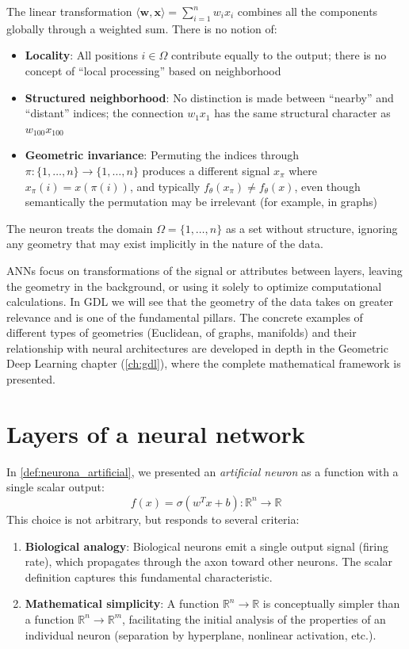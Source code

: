 The linear transformation $\langle \mathbf{w}, \mathbf{x} \rangle = \sum_{i=1}^n w_i x_i$ combines all the components globally through a weighted sum. There is no notion of:

\begin{itemize}
	\item \textbf{Locality}: All positions $i \in \Omega$ contribute equally to the output; there is no concept of ``local processing'' based on neighborhood

	\item \textbf{Structured neighborhood}: No distinction is made between ``nearby'' and ``distant'' indices; the connection $w_1 x_1$ has the same structural character as $w_{100} x_{100}$

	\item \textbf{Geometric invariance}: Permuting the indices through $\pi: \{1,\ldots,n\} \to \{1,\ldots,n\}$ produces a different signal $x_\pi$ where $x_\pi(i) = x(\pi(i))$, and typically $f_\theta(x_\pi) \neq f_\theta(x)$, even though semantically the permutation may be irrelevant (for example, in graphs)
\end{itemize}

The neuron treats the domain $\Omega = \{1,\ldots,n\}$ as a set without structure, ignoring any geometry that may exist implicitly in the nature of the data.

\glspl{ANN} focus on transformations of the signal or attributes between layers, leaving the geometry in the background, or using it solely to optimize computational calculations. In \gls{GDL} we will see that the geometry of the data takes on greater relevance and is one of the fundamental pillars. The concrete examples of different types of geometries (Euclidean, of graphs, manifolds) and their relationship with neural architectures are developed in depth in the Geometric Deep Learning chapter (\autoref{ch:gdl}), where the complete mathematical framework is presented.

\section{Layers of a neural network}

In \autoref{def:neurona_artificial}, we presented an \textit{artificial neuron} as a function with a single scalar output:
\[
f(x) = \sigma(w^T x + b): \mathbb{R}^n \to \mathbb{R}
\]
This choice is not arbitrary, but responds to several criteria:

\begin{enumerate}
    \item \textbf{Biological analogy}: Biological neurons emit a single output signal (firing rate), which propagates through the axon toward other neurons. The scalar definition captures this fundamental characteristic.

    \item \textbf{Mathematical simplicity}: A function $\mathbb{R}^n \to \mathbb{R}$ is conceptually simpler than a function $\mathbb{R}^n \to \mathbb{R}^m$, facilitating the initial analysis of the properties of an individual neuron (separation by hyperplane, nonlinear activation, etc.).
\end{enumerate}

